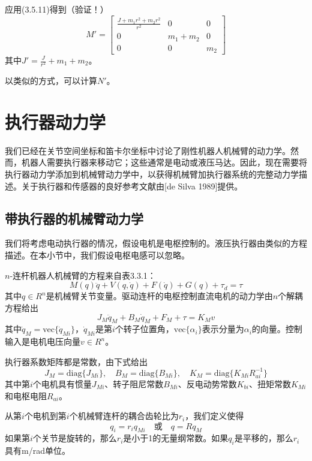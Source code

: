 \documentclass[12pt,a4paper]{ctexart}
\begin{document}
应用(3.5.11)得到（验证！）
\begin{equation}
M' = \begin{bmatrix} \frac{J+m_1r^2+m_2r^2}{r^2} & 0 & 0 \\ 0 & m_1+m_2 & 0 \\ 0 & 0 & m_2 \end{bmatrix}
\end{equation}
其中$J' = \frac{J}{r^2} + m_1 + m_2$。

以类似的方式，可以计算$N'$。

\section{执行器动力学}

我们已经在关节空间坐标和笛卡尔坐标中讨论了刚性机器人机械臂的动力学。然而，机器人需要执行器来移动它；这些通常是电动或液压马达。因此，现在需要将执行器动力学添加到机械臂动力学中，以获得机械臂加执行器系统的完整动力学描述。关于执行器和传感器的良好参考文献由[de Silva 1989]提供。

\subsection{带执行器的机械臂动力学}

我们将考虑电动执行器的情况，假设电机是电枢控制的。液压执行器由类似的方程描述。在本小节中，我们假设电枢电感可以忽略。

$n$-连杆机器人机械臂的方程来自表3.3.1：
\begin{equation}
M(q)\ddot{q} + V(q,\dot{q}) + F(\dot{q}) + G(q) + \tau_d = \tau
\end{equation}
其中$q \in R^n$是机械臂关节变量。驱动连杆的电枢控制直流电机的动力学由$n$个解耦方程给出
\begin{equation}
J_M\ddot{q}_M + B_M\dot{q}_M + F_M + \tau = K_M v
\end{equation}
其中$\dot{q}_M = \text{vec}\{\dot{q}_{Mi}\}$，$\dot{q}_{Mi}$是第$i$个转子位置角，$\text{vec}\{\alpha_i\}$表示分量为$\alpha_i$的向量。控制输入是电机电压向量$v \in R^n$。

执行器系数矩阵都是常数，由下式给出
\begin{equation}
J_M = \text{diag}\{J_{Mi}\}, \quad B_M = \text{diag}\{B_{Mi}\}, \quad K_M = \text{diag}\{K_{Mi}R_{ai}^{-1}\}
\end{equation}
其中第$i$个电机具有惯量$J_{Mi}$、转子阻尼常数$B_{Mi}$、反电动势常数$K_{bi}$、扭矩常数$K_{Mi}$和电枢电阻$R_{ai}$。

从第$i$个电机到第$i$个机械臂连杆的耦合齿轮比为$r_i$，我们定义使得
\begin{equation}
q_i = r_i q_{Mi} \quad \text{或} \quad q = Rq_M
\end{equation}
如果第$i$个关节是旋转的，那么$r_i$是小于1的无量纲常数。如果$q_i$是平移的，那么$r_i$具有m/rad单位。
\end{document}
